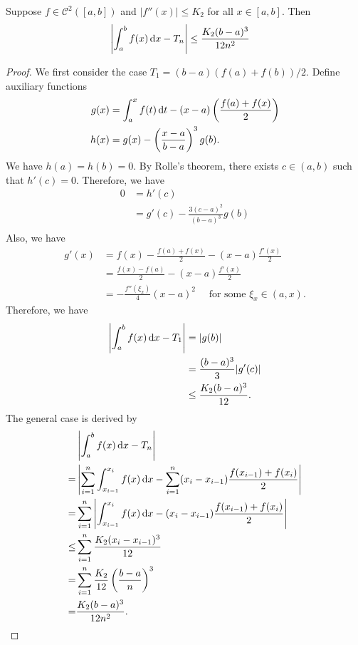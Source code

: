 \begin{theorem}
    Suppose $f\in \mathcal{C}^2([a,b])$ and $|f''(x)|\le K_2$ for all $x \in [a,b]$. Then
    \begin{align*}
        \left|\int_{a}^{b} f(x) \operatorname*{d\!} x - T_n\right| &\le \frac{K_2(b-a)^3}{12n^2}
    \end{align*}
\end{theorem}
\begin{proof}
    We first consider the case $T_1=(b-a)(f(a)+f(b))/2$. Define auxiliary functions
    \begin{align*}
        g(x) &= \int_{a}^{x} f(t) \operatorname*{d\!} t - (x-a)\left(\frac{f(a)+f(x)}{2}\right) \\
        h(x) &= g(x) - \left(\frac{x-a}{b-a}\right)^3 g(b).
    \end{align*}
    We have $h(a)=h(b)=0$. By Rolle's theorem, there exists $c \in (a,b)$ such that $h'(c)=0$. Therefore, we have
    \begin{align*}
        0 &= h'(c) \\
        &= g'(c) - \frac{3(c-a)^2}{(b-a)^3} g(b) \\
    \end{align*}
    Also, we have
    \begin{align*}
        g'(x) &= f(x) - \frac{f(a)+f(x)}{2} - (x-a)\frac{f'(x)}{2} \\
        &= \frac{f(x)-f(a)}{2} - (x-a)\frac{f'(x)}{2} \\
        &= -\frac{f''(\xi_x)}{4}(x-a)^2 \quad \text{ for some } \xi_x \in (a,x).
    \end{align*}
    Therefore, we have
    \begin{align*}
        \left|\int_{a}^{b} f(x) \operatorname*{d\!} x - T_1\right| &= |g(b)| \\
        &= \frac{(b-a)^3}{3} |g'(c)| \\
        &\le \frac{K_2(b-a)^3}{12}.
    \end{align*}
    The general case is derived by
    \begin{align*}
        &\left|\int_{a}^{b} f(x) \operatorname*{d\!} x - T_n\right|\\
        =& \left|\sum_{i=1}^{n}\int_{x_{i-1}}^{x_i} f(x) \operatorname*{d\!} x - \sum_{i=1}^{n} (x_i - x_{i-1})\frac{f(x_{i-1})+f(x_i)}{2}\right|\\
        =& \sum_{i=1}^{n}\left|\int_{x_{i-1}}^{x_i} f(x) \operatorname*{d\!} x - (x_i - x_{i-1})\frac{f(x_{i-1})+f(x_i)}{2}\right|\\
        \le& \sum_{i=1}^{n} \frac{K_2(x_i - x_{i-1})^3}{12}\\
        =& \sum_{i=1}^{n} \frac{K_2}{12}\left(\frac{b-a}{n}\right)^3\\
        =& \frac{K_2(b-a)^3}{12n^2}.
    \end{align*}
\end{proof}

